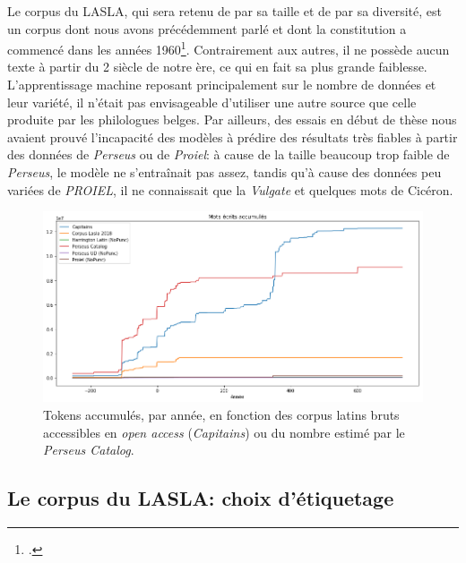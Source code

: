 Le corpus du LASLA, qui sera retenu de par sa taille et de par sa diversité, est un corpus dont nous avons précédemment parlé et dont la constitution a commencé dans les années 1960\footcites{delatte_laboratoire_1961}{BodsonCodification1966}. Contrairement aux autres, il ne possède aucun texte à partir du 2 siècle de notre ère, ce qui en fait sa plus grande faiblesse. L'apprentissage machine reposant principalement sur le nombre de données et leur variété, il n'était pas envisageable d'utiliser une autre source que celle produite par les philologues belges. Par ailleurs, des essais en début de thèse nous avaient prouvé l'incapacité des modèles à prédire des résultats très fiables à partir des données de \textit{Perseus} ou de \textit{Proiel}: à cause de la taille beaucoup trop faible de \textit{Perseus}, le modèle ne s'entraînait pas assez, tandis qu'à cause des données peu variées de \textit{PROIEL}, il ne connaissait que la \textit{Vulgate} et quelques mots de Cicéron.

\begin{figure}
    \includegraphics[width=\linewidth]{figures/chap3/corpus/tokens_per_year.png}
    \caption{Tokens accumulés, par année, en fonction des corpus latins bruts accessibles en \textit{open access} (\textit{Capitains}) ou du nombre estimé  par le \textit{Perseus Catalog}.}
    \label{fig:lemmatisation:corpus-entrainement}
\end{figure}

\subsection{Le corpus du LASLA: choix d'étiquetage}

